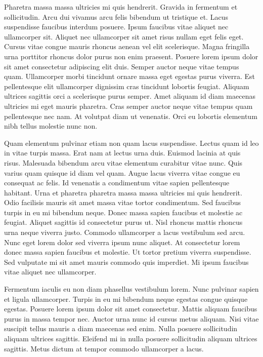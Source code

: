 \documentclass[]{tufte-handout}
\begin{document}
Pharetra massa massa ultricies mi quis hendrerit. Gravida in fermentum
et sollicitudin. Arcu dui vivamus arcu felis bibendum ut tristique et.
Lacus suspendisse faucibus interdum posuere. Ipsum faucibus vitae
aliquet nec ullamcorper sit. Aliquet nec ullamcorper sit amet risus
nullam eget felis eget. Cursus vitae congue mauris rhoncus aenean vel
elit scelerisque. Magna fringilla urna porttitor rhoncus dolor purus non
enim praesent. Posuere lorem ipsum dolor sit amet consectetur adipiscing
elit duis. Semper auctor neque vitae tempus quam. Ullamcorper morbi
tincidunt ornare massa eget egestas purus viverra. Est pellentesque elit
ullamcorper dignissim cras tincidunt lobortis feugiat. Aliquam ultrices
sagittis orci a scelerisque purus semper. Amet aliquam id diam maecenas
ultricies mi eget mauris pharetra. Cras semper auctor neque vitae tempus
quam pellentesque nec nam. At volutpat diam ut venenatis. Orci eu
lobortis elementum nibh tellus molestie nunc non.

Quam elementum pulvinar etiam non quam lacus suspendisse. Lectus quam id
leo in vitae turpis massa. Erat nam at lectus urna duis. Euismod lacinia
at quis risus. Malesuada bibendum arcu vitae elementum curabitur vitae
nunc. Quis varius quam quisque id diam vel quam. Augue lacus viverra
vitae congue eu consequat ac felis. Id venenatis a condimentum vitae
sapien pellentesque habitant. Urna et pharetra pharetra massa massa
ultricies mi quis hendrerit. Odio facilisis mauris sit amet massa vitae
tortor condimentum. Sed faucibus turpis in eu mi bibendum neque. Donec
massa sapien faucibus et molestie ac feugiat. Aliquet sagittis id
consectetur purus ut. Nisl rhoncus mattis rhoncus urna neque viverra
justo. Commodo ullamcorper a lacus vestibulum sed arcu. Nunc eget lorem
dolor sed viverra ipsum nunc aliquet. At consectetur lorem donec massa
sapien faucibus et molestie. Ut tortor pretium viverra suspendisse. Sed
vulputate mi sit amet mauris commodo quis imperdiet. Mi ipsum faucibus
vitae aliquet nec ullamcorper.

Fermentum iaculis eu non diam phasellus vestibulum lorem. Nunc pulvinar
sapien et ligula ullamcorper. Turpis in eu mi bibendum neque egestas
congue quisque egestas. Posuere lorem ipsum dolor sit amet consectetur.
Mattis aliquam faucibus purus in massa tempor nec. Auctor urna nunc id
cursus metus aliquam. Nisi vitae suscipit tellus mauris a diam maecenas
sed enim. Nulla posuere sollicitudin aliquam ultrices sagittis. Eleifend
mi in nulla posuere sollicitudin aliquam ultrices sagittis. Metus dictum
at tempor commodo ullamcorper a lacus.
\end{document}
